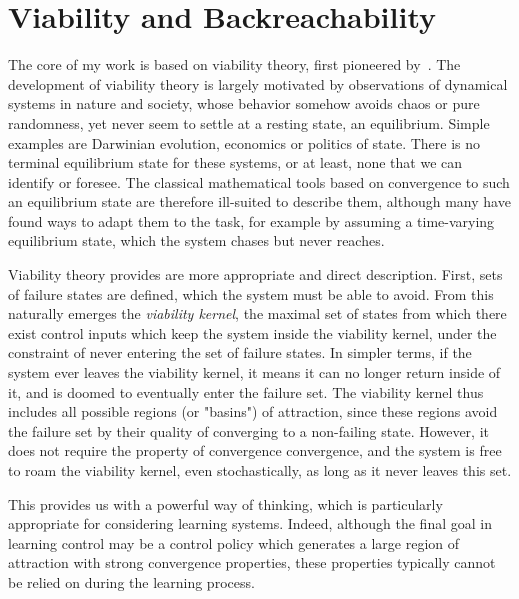 
\section{Viability and Backreachability}

The core of my work is based on viability theory, first pioneered by~\textcite{aubin2011viability}. The development of viability theory is largely motivated by observations of dynamical systems in nature and society, whose behavior somehow avoids chaos or pure randomness, yet never seem to settle at a resting state, an equilibrium.
Simple examples are Darwinian evolution, economics or politics of state. There is no terminal equilibrium state for these systems, or at least, none that we can identify or foresee.
The classical mathematical tools based on convergence to such an equilibrium state are therefore ill-suited to describe them, although many have found ways to adapt them to the task, for example by assuming a time-varying equilibrium state, which the system chases but never reaches. \par
Viability theory provides are more appropriate and direct description. First, sets of failure states are defined, which the system must be able to avoid. From this naturally emerges the \emph{viability kernel}, the maximal set of states from which there exist control inputs which keep the system inside the viability kernel, under the constraint of never entering the set of failure states. In simpler terms, if the system ever leaves the viability kernel, it means it can no longer return inside of it, and is doomed to eventually enter the failure set.
The viability kernel thus includes all possible regions (or "basins") of attraction, since these regions avoid the failure set by their quality of converging to a non-failing state. However, it does not require the property of convergence convergence, and the system is free to roam the viability kernel, even stochastically, as long as it never leaves this set. \par
This provides us with a powerful way of thinking, which is particularly appropriate for considering learning systems. Indeed, although the final goal in learning control may be a control policy which generates a large region of attraction with strong convergence properties, these properties typically cannot be relied on during the learning process. \par
